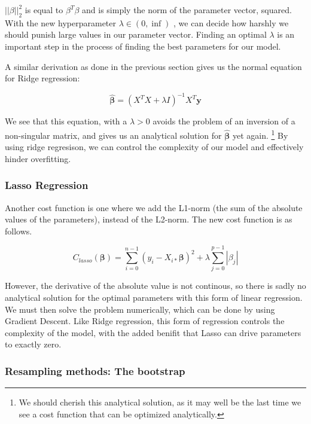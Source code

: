 \documentclass[twocolumn,10pt,cleanfoot]{asme2ej}
\begin{document}
	$||\beta||_2^2$ is equal to $\beta^T\beta$ and is simply the norm of the parameter vector, squared. With the new hyperparameter $\lambda \in (0, \inf)$ , we can decide how harshly we should punish large values in our parameter vector. Finding an optimal $\lambda$ is an important step in the process of finding the best parameters for our model.

A similar derivation as done in the previous section gives us the normal equation for Ridge regression:

\begin{equation}
	\bm{\hat{\beta}} = (X^TX + \lambda I)^{-1}X^T\bm{y}
\end{equation}

	We see that this equation, with a $\lambda > 0$ avoids the problem of an inversion of a non-singular matrix, and gives us an analytical solution for $\bm{\hat{\beta}}$ yet again. \footnote{We should cherish this analytical solution, as it may well be the last time we see a cost function that can be optimized analytically.} By using ridge regresison, we can control the complexity of our model and effectively hinder overfitting.

\subsubsection{Lasso Regression}

	Another cost function is one where we add the L1-norm (the sum of the absolute values of the parameters), instead of the L2-norm. The new cost function is as follows.

\begin{equation}
	C_{lasso}(\bm{\beta}) = \sum_{i=0}^{n-1}(y_i-X_{i*}\bm{\beta})^2 + \lambda \sum_{j=0}^{p-1} |\beta_j|
\end{equation}

However, the derivative of the absolute value is not continous, so there is sadly no analytical solution for the optimal parameters with this form of linear regression. We must then solve the problem numerically, which can be done by using Gradient Descent. Like Ridge regression, this form of regression controls the complexity of the model, with the added benifit that Lasso can drive parameters to exactly zero.

\subsubsection{Resampling methods: The bootstrap}
\end{document}
